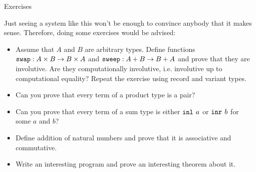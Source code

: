 \documentclass{beamer}
\begin{document}
\begin{frame}{Exercises}

Just seeing a system like this won't be enough to convince anybody that it makes sense. Therefore, doing some exercises would be advised:

\begin{itemize}
  \item Assume that $A$ and $B$ are arbitrary types. Define functions $\texttt{swap} : A \times B \to B \times A$ and $\texttt{sweep} : A + B \to B + A$ and prove that they are involutive. Are they computationally involutive, i.e. involutive up to computational equality? Repeat the exercise using record and variant types.
  \item Can you prove that every term of a product type is a pair?
  \item Can you prove that every term of a sum type is either $\texttt{inl}_{}\ a$ or $\texttt{inr}_{}\ b$ for some $a$ and $b$?
  \item Define addition of natural numbers and prove that it is associative and commutative.
  \item Write an interesting program and prove an interesting theorem about it.
\end{itemize}

\end{frame}

\end{document}
